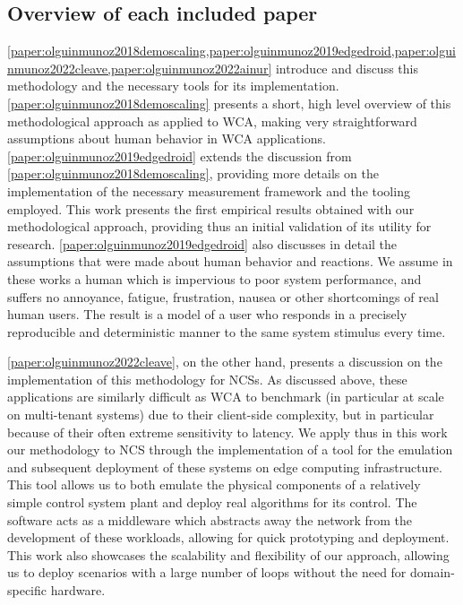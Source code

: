 \subsection{Overview of each included paper}

\cref{paper:olguinmunoz2018demoscaling,paper:olguinmunoz2019edgedroid,paper:olguinmunoz2022cleave,paper:olguinmunoz2022ainur} introduce and discuss this methodology and the necessary tools for its implementation.
\cref{paper:olguinmunoz2018demoscaling} presents a short, high level overview of this methodological approach as applied to \gls{WCA}, making very straightforward assumptions about human behavior in \gls{WCA} applications.
\cref{paper:olguinmunoz2019edgedroid} extends the discussion from \cref{paper:olguinmunoz2018demoscaling}, providing more details on the implementation of the necessary measurement framework and the tooling employed.
This work presents the first empirical results obtained with our methodological approach, providing thus an initial validation of its utility for research.
\cref{paper:olguinmunoz2019edgedroid} also discusses in detail the assumptions that were made about human behavior and reactions.
We assume in these works a human which is impervious to poor system performance, and suffers no annoyance, fatigue, frustration, nausea or other shortcomings of real human users.
The result is a model of a user who responds in a precisely reproducible and deterministic manner to the same system stimulus every time.

\cref{paper:olguinmunoz2022cleave}, on the other hand, presents a discussion on the implementation of this methodology for \glspl{NCS}.
As discussed above, these applications are similarly difficult as \gls{WCA} to benchmark (in particular at scale on multi-tenant systems) due to their client-side complexity, but in particular because of their often extreme sensitivity to latency.
We apply thus in this work our methodology to \gls{NCS} through the implementation of a tool for the emulation and subsequent deployment of these systems on edge computing infrastructure.
This tool allows us to both emulate the physical components of a relatively simple control system plant and deploy real algorithms for its control.
The software acts as a middleware which abstracts away the network from the development of these workloads, allowing for quick prototyping and deployment.
This work also showcases the scalability and flexibility of our approach, allowing us to deploy scenarios with a large number of loops without the need for domain-specific hardware.

